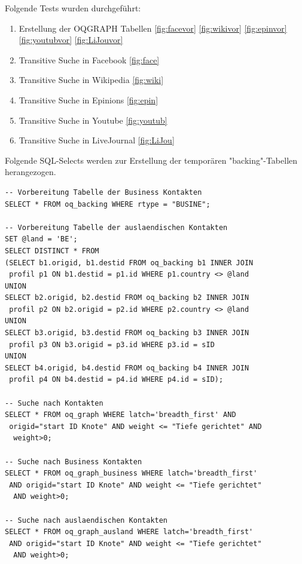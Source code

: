 Folgende Tests wurden durchgeführt:
\begin{enumerate}
	\item Erstellung der OQGRAPH Tabellen \ref{fig:facevor}
	\ref{fig:wikivor}
	\ref{fig:epinvor}
	\ref{fig:youtubvor}
	\ref{fig:LiJouvor}
	\item Transitive Suche in Facebook
	\ref{fig:face}
	\item Transitive Suche in Wikipedia
	\ref{fig:wiki}
	\item Transitive Suche in Epinions 
	\ref{fig:epin}
	\item Transitive Suche in Youtube 
	\ref{fig:youtub}
	\item Transitive Suche in LiveJournal 
	\ref{fig:LiJou}
\end{enumerate}


Folgende SQL-Selects werden zur Erstellung der temporären "backing"-Tabellen herangezogen.
\begin{lstlisting}
-- Vorbereitung Tabelle der Business Kontakten
SELECT * FROM oq_backing WHERE rtype = "BUSINE";

-- Vorbereitung Tabelle der auslaendischen Kontakten
SET @land = 'BE';
SELECT DISTINCT * FROM 
(SELECT b1.origid, b1.destid FROM oq_backing b1 INNER JOIN
 profil p1 ON b1.destid = p1.id WHERE p1.country <> @land
UNION
SELECT b2.origid, b2.destid FROM oq_backing b2 INNER JOIN
 profil p2 ON b2.origid = p2.id WHERE p2.country <> @land
UNION
SELECT b3.origid, b3.destid FROM oq_backing b3 INNER JOIN
 profil p3 ON b3.origid = p3.id WHERE p3.id = sID
UNION
SELECT b4.origid, b4.destid FROM oq_backing b4 INNER JOIN
 profil p4 ON b4.destid = p4.id WHERE p4.id = sID);
 
-- Suche nach Kontakten
SELECT * FROM oq_graph WHERE latch='breadth_first' AND
 origid="start ID Knote" AND weight <= "Tiefe gerichtet" AND
  weight>0;
  
-- Suche nach Business Kontakten
SELECT * FROM oq_graph_business WHERE latch='breadth_first'
 AND origid="start ID Knote" AND weight <= "Tiefe gerichtet"
  AND weight>0;
  
-- Suche nach auslaendischen Kontakten
SELECT * FROM oq_graph_ausland WHERE latch='breadth_first'
 AND origid="start ID Knote" AND weight <= "Tiefe gerichtet"
  AND weight>0;
\end{lstlisting}


